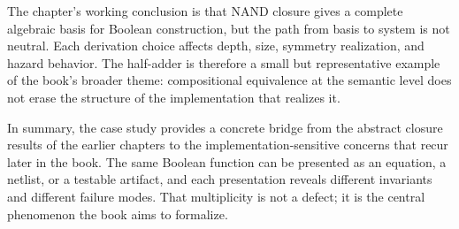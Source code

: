 The chapter’s working conclusion is that NAND closure gives a complete algebraic basis for Boolean construction, but the path from basis to system is not neutral. Each derivation choice affects depth, size, symmetry realization, and hazard behavior. The half-adder is therefore a small but representative example of the book’s broader theme: compositional equivalence at the semantic level does not erase the structure of the implementation that realizes it.

In summary, the case study provides a concrete bridge from the abstract closure results of the earlier chapters to the implementation-sensitive concerns that recur later in the book. The same Boolean function can be presented as an equation, a netlist, or a testable artifact, and each presentation reveals different invariants and different failure modes. That multiplicity is not a defect; it is the central phenomenon the book aims to formalize.
